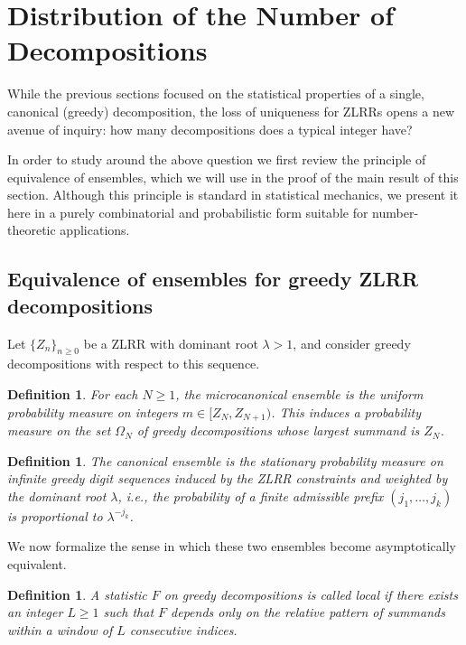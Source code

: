 \documentclass[11pt]{amsart}
\theoremstyle{plain}
\numberwithin{equation}{section} %
\newtheorem{definition}[thm]{Definition}
\numberwithin{table}{section} %
\numberwithin{figure}{section}
\begin{document}
	\section{Distribution of the Number of Decompositions}
	
	While the previous sections focused on the statistical properties of a single, canonical (greedy) decomposition, the loss of uniqueness for ZLRRs opens a new avenue of inquiry: how many decompositions does a typical integer have? 
	
	In order to study around the above question we first review the  principle of equivalence of ensembles, which we will use in the proof of the main result of this section.
	Although
	this principle is standard in statistical mechanics, we present it here in a
	purely combinatorial and probabilistic form suitable for number-theoretic
	applications.
	
	\subsection{Equivalence of ensembles for greedy ZLRR decompositions}
	
	
	Let $\{Z_n\}_{n\ge0}$ be a ZLRR with dominant root $\lambda>1$, and consider greedy
	decompositions with respect to this sequence.
	
	\begin{definition}
		\label{def:Micro}
		For each $N\ge1$, the \emph{microcanonical ensemble} is the uniform probability
		measure on integers $m\in[Z_N,Z_{N+1})$. This induces a probability measure on
		the set $\Omega_N$ of greedy decompositions whose largest summand is $Z_N$.
	\end{definition}
	
	\begin{definition}
		\label{def:Canonical}
		The \emph{canonical ensemble} is the stationary probability measure on infinite
		greedy digit sequences induced by the ZLRR constraints and weighted by the
		dominant root $\lambda$, i.e., the probability of a finite admissible prefix
		$(j_1,\dots,j_k)$ is proportional to $\lambda^{-j_k}$.
	\end{definition}
	
	We now formalize the sense in which these two ensembles become asymptotically
	equivalent.
	
	
	\begin{definition} 
		\label{def:LocalStat}
		A statistic $F$ on greedy decompositions is called \emph{local} if there exists
		an integer $L\ge1$ such that $F$ depends only on the relative pattern of summands
		within a window of $L$ consecutive indices.
	\end{definition}
	
\end{document}
